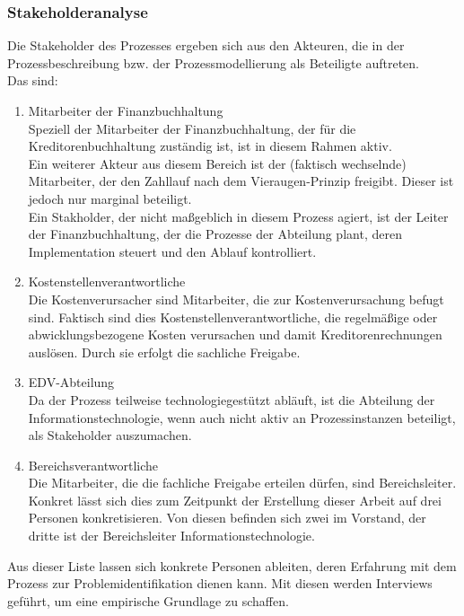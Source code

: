 \subsubsection{Stakeholderanalyse}
Die Stakeholder des Prozesses ergeben sich aus den Akteuren, die in der Prozessbeschreibung bzw. der Prozessmodellierung als Beteiligte auftreten.\\
Das sind:


\begin{enumerate}
\item{Mitarbeiter der Finanzbuchhaltung}
\\ Speziell der Mitarbeiter der Finanzbuchhaltung, der für die Kreditorenbuchhaltung zuständig ist, ist in diesem Rahmen aktiv. 
\\ Ein weiterer Akteur aus diesem Bereich ist der (faktisch wechselnde) Mitarbeiter, der den Zahllauf nach dem Vieraugen-Prinzip freigibt. 
Dieser ist jedoch nur marginal beteiligt.
\\ Ein Stakholder, der nicht maßgeblich in diesem Prozess agiert, ist der Leiter der Finanzbuchhaltung, der die Prozesse der Abteilung plant, deren Implementation steuert und den Ablauf kontrolliert.

\item{Kostenstellenverantwortliche}
\\ Die Kostenverursacher sind Mitarbeiter, die zur Kostenverursachung befugt sind. 
Faktisch sind dies Kostenstellenverantwortliche, die regelmäßige oder abwicklungsbezogene Kosten verursachen und damit Kreditorenrechnungen auslösen. 
Durch sie erfolgt die sachliche Freigabe.

\item{EDV-Abteilung}
\\ Da der Prozess teilweise technologiegestützt abläuft, ist die Abteilung der Informationstechnologie, wenn auch nicht aktiv an Prozessinstanzen beteiligt, als Stakeholder auszumachen. 

\item{Bereichsverantwortliche}
\\ Die Mitarbeiter, die die fachliche Freigabe erteilen dürfen, sind Bereichsleiter. 
Konkret lässt sich dies zum Zeitpunkt der Erstellung dieser Arbeit auf drei Personen konkretisieren. 
Von diesen befinden sich zwei im Vorstand, der dritte ist der Bereichsleiter Informationstechnologie.\\

\end{enumerate}

Aus dieser Liste lassen sich konkrete Personen ableiten, deren Erfahrung mit dem Prozess zur Problemidentifikation dienen kann. 
Mit diesen werden Interviews geführt, um eine empirische Grundlage zu schaffen.

